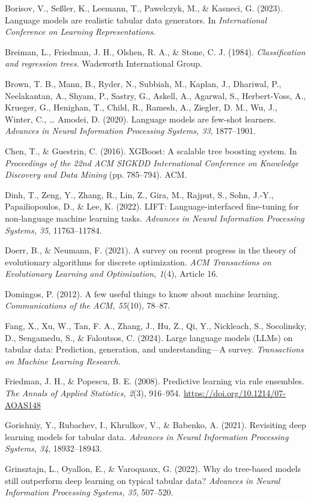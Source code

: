 \documentclass[11pt]{article}
\begin{document}
Borisov, V., Seßler, K., Leemann, T., Pawelczyk, M., \& Kasneci, G. (2023). Language models are
realistic tabular data generators. In \emph{International Conference on Learning Representations}.

Breiman, L., Friedman, J. H., Olshen, R. A., \& Stone, C. J. (1984). \emph{Classification and
regression trees}. Wadsworth International Group.

Brown, T. B., Mann, B., Ryder, N., Subbiah, M., Kaplan, J., Dhariwal, P., Neelakantan, A., Shyam,
P., Sastry, G., Askell, A., Agarwal, S., Herbert-Voss, A., Krueger, G., Henighan, T., Child, R.,
Ramesh, A., Ziegler, D. M., Wu, J., Winter, C., \ldots{} Amodei, D. (2020). Language models are
few-shot learners. \emph{Advances in Neural Information Processing Systems, 33}, 1877--1901.

Chen, T., \& Guestrin, C. (2016). XGBoost: A scalable tree boosting system. In \emph{Proceedings of
the 22nd ACM SIGKDD International Conference on Knowledge Discovery and Data Mining} (pp. 785--794).
ACM.

Dinh, T., Zeng, Y., Zhang, R., Lin, Z., Gira, M., Rajput, S., Sohn, J.-Y., Papailiopoulos, D., \&
Lee, K. (2022). LIFT: Language-interfaced fine-tuning for non-language machine learning tasks.
\emph{Advances in Neural Information Processing Systems, 35}, 11763--11784.

Doerr, B., \& Neumann, F. (2021). A survey on recent progress in the theory of evolutionary
algorithms for discrete optimization. \emph{ACM Transactions on Evolutionary Learning and
Optimization, 1}(4), Article 16.

Domingos, P. (2012). A few useful things to know about machine learning. \emph{Communications of the
ACM, 55}(10), 78--87.

Fang, X., Xu, W., Tan, F. A., Zhang, J., Hu, Z., Qi, Y., Nickleach, S., Socolinsky, D., Sengamedu,
S., \& Faloutsos, C. (2024). Large language models (LLMs) on tabular data: Prediction, generation,
and understanding---A survey. \emph{Transactions on Machine Learning Research}.

Friedman, J. H., \& Popescu, B. E. (2008). Predictive learning via rule ensembles. \emph{The Annals
of Applied Statistics, 2}(3), 916--954. \url{https://doi.org/10.1214/07-AOAS148}

Gorishniy, Y., Rubachev, I., Khrulkov, V., \& Babenko, A. (2021). Revisiting deep learning models for
tabular data. \emph{Advances in Neural Information Processing Systems, 34}, 18932--18943.

Grinsztajn, L., Oyallon, E., \& Varoquaux, G. (2022). Why do tree-based models still outperform deep
learning on typical tabular data? \emph{Advances in Neural Information Processing Systems, 35},
507--520.
\end{document}
